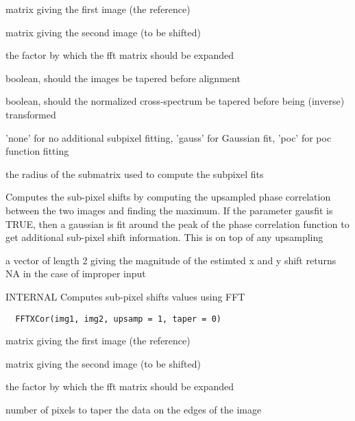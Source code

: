 \documentclass[a4paper]{book}
\begin{document}
\begin{Arguments}
\begin{ldescription}
\item[\code{img1}] matrix giving the first image (the
reference)

\item[\code{img2}] matrix giving the second image (to be
shifted)

\item[\code{upsamp}] the factor by which the fft matrix should
be expanded

\item[\code{taper}] boolean, should the images be tapered before
alignment

\item[\code{cortaper}] boolean, should the normalized
cross-spectrum be tapered before being (inverse)
transformed

\item[\code{subpixel}] 'none' for no additional subpixel
fitting, 'gauss' for Gaussian fit, 'poc' for poc function
fitting

\item[\code{subrad}] the radius of the submatrix used to compute
the subpixel fits
\end{ldescription}
\end{Arguments}
%
\begin{Details}\relax
Computes the sub-pixel shifts by computing the upsampled
phase correlation between the two images and finding the
maximum.  If the parameter gausfit is TRUE, then a
gaussian is fit around the peak of the phase correlation
function to get additional sub-pixel shift information.
This is on top of any upsampling
\end{Details}
%
\begin{Value}
a vector of length 2 giving the magnitude of the estimted
x and y shift returns NA in the case of improper input
\end{Value}
%
\begin{Description}\relax
INTERNAL Computes sub-pixel shifts values using FFT
\end{Description}
%
\begin{Usage}
\begin{verbatim}
  FFTXCor(img1, img2, upsamp = 1, taper = 0)
\end{verbatim}
\end{Usage}
%
\begin{Arguments}
\begin{ldescription}
\item[\code{img1}] matrix giving the first image (the
reference)

\item[\code{img2}] matrix giving the second image (to be
shifted)

\item[\code{upsamp}] the factor by which the fft matrix should
be expanded

\item[\code{taper}] number of pixels to taper the data on the
edges of the image
\end{ldescription}
\end{Arguments}
\end{document}
